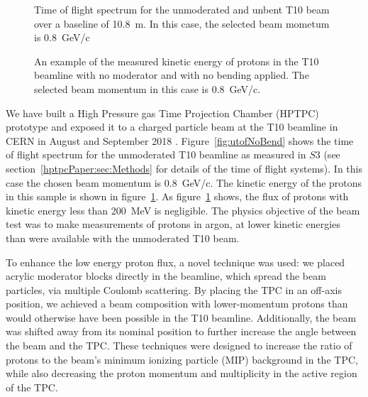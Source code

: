 \begin{figure}
  \begin{minipage}[t]{0.49\textwidth}
    \centering
    \begin{adjustbox}{max totalsize={\textwidth},center}
      
    \end{adjustbox}
    \caption{Time of flight spectrum for the unmoderated and unbent T10 beam over a baseline of 10.8~m. In this case, the selected beam mometum is 0.8~GeV/c}
    \label{fig:utofNoBend}
  \end{minipage}
  \hfill
  \begin{minipage}[t]{0.49\textwidth}
    \centering
    \begin{adjustbox}{max totalsize={\textwidth},center}
      
    \end{adjustbox}
    \caption{An example of the measured kinetic energy of protons in the T10 beamline with no moderator and with no bending applied. The selected beam momentum in this case is 0.8~GeV/c.}
    \label{fig:keNoBend}
  \end{minipage}
\end{figure}

We have built a High Pressure gas Time Projection Chamber (HPTPC) prototype and exposed it to a charged particle beam at the T10 beamline in CERN in August and September 2018 \cite{SPSC-P-355}.
Figure~\ref{fig:utofNoBend} shows the time of flight spectrum for the unmoderated T10 beamline as measured in $\mathit{S3}$ (see section~\ref{hptpcPaper:sec:Methods} for details of the time of flight systems).
In this case the chosen beam momentum is 0.8~GeV/c.
The kinetic energy of the protons in this sample is shown in figure~\ref{fig:keNoBend}.
As figure~\ref{fig:keNoBend} shows, the flux of protons with kinetic energy less than 200~MeV is negligible.
The physics objective of the beam test was to make measurements of protons in argon, at lower kinetic energies than were available with the unmoderated T10 beam. 

To enhance the low energy proton flux, a novel technique was used:
we placed acrylic moderator blocks directly in the beamline, which spread the beam particles, via multiple Coulomb scattering.
By placing the TPC in an off-axis position, we achieved a beam composition with lower-momentum protons than would otherwise have been possible in the T10 beamline.
Additionally, the beam was shifted away from its nominal position to further increase the angle between the beam and the TPC.
These techniques were designed to increase the ratio of protons to the beam's minimum ionizing particle (MIP) background in the TPC, while also decreasing the proton momentum and multiplicity in the active region of the TPC.

